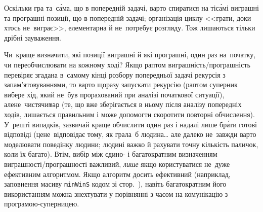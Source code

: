 \Tutorial %
Оскільки гра та~с\'{а}ма, що в попередній задачі, 
варто
спиратися на ті\nolinebreak[3] с\'{а}мі виграшні та програшні позиції, що 
в попередній
задачі; організація циклу <<грати, доки хтось не~виграє>>, елементарна й не~потребує розгляду.
Тож лишаються тільки дрібні зауваження.

Чи~краще визначити, які позиції виграшні й які програшні, один раз на~початку, чи переобчислювати на кожному ході?
Якщо раптом виграшність\nolinebreak\hspace{0pt plus 1pt}/\nolinebreak[2]\hspace{0pt plus 1pt}про\-граш\-ність перевіряє згадана в~самому кінці розбору попередньої задачі рекурсія з за\-пам'\-я\-то\-ву\-ва\-н\-ня\-ми, то варто щоразу запускати рекурсію (раптом суперник вибере хід, який не~був прорахований при аналізі початкової ситуації), але\nolinebreak[2] не~чистячи\nolinebreak[2] \texttt{map} (те, що вже зберігається в ньому після аналізу попередніх ходів, лишається правильним і може допомогти скоротити повторні обчислення).
У~решті випадків, зазвичай краще обчислити один раз і надалі лише бр\'{а}ти готові відповіді (це\nolinebreak[3] не~відповідає тому, як грала~б людина\dots{} але далеко не~завжди варто моделювати поведінку людини; людині важко й рахувати точну кількість паличок, коли їх багато).
Втім, вибір між єдино- і багатократним визначенням виграшності\nolinebreak\hspace{0pt plus 1pt}/\nolinebreak[2]\hspace{0pt plus 1pt}про\-граш\-но\-сті важливий, \emph{лише} якщо користуватися не~дуже ефективним алгоритмом.
Якщо алгоритм досить ефективний (наприклад, заповнення масиву \texttt{minWinS} кодом зі стор.~\pageref{code:201819-2-D-sticks-with-spec-moves-calc-minWinS}), навіть багатократним його використанням можна знехтувати у порівнянні з часом на комунікацію з програмою-суперницею.


